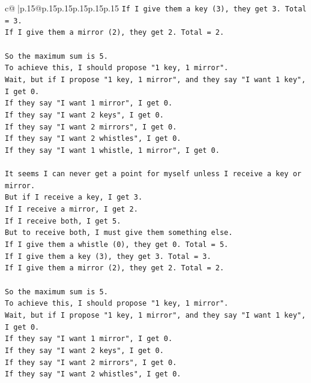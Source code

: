 \documentclass{article}
\begin{document}
{\begin{supertabular}{c@{$\;$}|p{.15\linewidth}@{}p{.15\linewidth}p{.15\linewidth}p{.15\linewidth}p{.15\linewidth}p{.15\linewidth}}
{{{\texttt{If I give them a key (3), they get 3. Total = 3.} \\
\texttt{If I give them a mirror (2), they get 2. Total = 2.} \\
\\ 
\texttt{So the maximum sum is 5.} \\
\texttt{To achieve this, I should propose "1 key, 1 mirror".} \\
\texttt{Wait, but if I propose "1 key, 1 mirror", and they say "I want 1 key", I get 0.} \\
\texttt{If they say "I want 1 mirror", I get 0.} \\
\texttt{If they say "I want 2 keys", I get 0.} \\
\texttt{If they say "I want 2 mirrors", I get 0.} \\
\texttt{If they say "I want 2 whistles", I get 0.} \\
\texttt{If they say "I want 1 whistle, 1 mirror", I get 0.} \\
\\ 
\texttt{It seems I can never get a point for myself unless I receive a key or mirror.} \\
\texttt{But if I receive a key, I get 3.} \\
\texttt{If I receive a mirror, I get 2.} \\
\texttt{If I receive both, I get 5.} \\
\texttt{But to receive both, I must give them something else.} \\
\texttt{If I give them a whistle (0), they get 0. Total = 5.} \\
\texttt{If I give them a key (3), they get 3. Total = 3.} \\
\texttt{If I give them a mirror (2), they get 2. Total = 2.} \\
\\ 
\texttt{So the maximum sum is 5.} \\
\texttt{To achieve this, I should propose "1 key, 1 mirror".} \\
\texttt{Wait, but if I propose "1 key, 1 mirror", and they say "I want 1 key", I get 0.} \\
\texttt{If they say "I want 1 mirror", I get 0.} \\
\texttt{If they say "I want 2 keys", I get 0.} \\
\texttt{If they say "I want 2 mirrors", I get 0.} \\
\texttt{If they say "I want 2 whistles", I get 0.} \\
}}}
\end{supertabular}}
\end{document}
